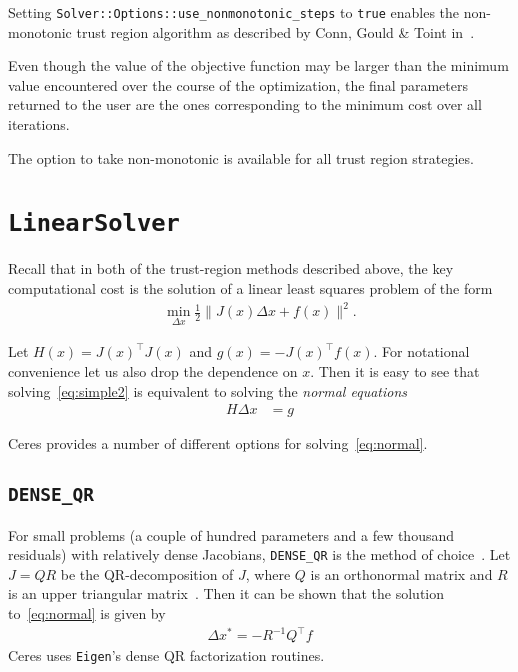 Setting \texttt{Solver::Options::use\_nonmonotonic\_steps} to \texttt{true}
enables the non-monotonic trust region algorithm as described by
Conn,  Gould \& Toint in~\cite{conn2000trust}.

Even though the value of the objective function may be larger
than the minimum value encountered over the course of the
optimization, the final parameters returned to the user are the
ones corresponding to the minimum cost over all iterations.

The option to take non-monotonic is available for all trust region
strategies.

\section{\texttt{LinearSolver}}
Recall that in both of the trust-region methods described above, the key computational cost is the solution of a linear least squares problem of the form
\begin{align}
 \min_{\Delta x} \frac{1}{2} \|J(x)\Delta x + f(x)\|^2 .
 \label{eq:simple2}
\end{align}


Let $H(x)= J(x)^\top J(x)$ and $g(x) = -J(x)^\top  f(x)$. For notational convenience let us also drop the dependence on $x$. Then it is easy to see that solving~\eqref{eq:simple2} is equivalent to solving the {\em normal equations}
\begin{align}
H \Delta x  &= g \label{eq:normal}
\end{align}

Ceres provides a number of different options for solving~\eqref{eq:normal}.

\subsection{\texttt{DENSE\_QR}}
For small problems (a couple of hundred parameters and a few thousand residuals) with relatively dense Jacobians, \texttt{DENSE\_QR} is the method of choice~\cite{bjorck1996numerical}. Let $J = QR$ be the QR-decomposition of $J$, where $Q$ is an orthonormal matrix and $R$ is an upper triangular matrix~\cite{trefethen1997numerical}. Then it can be shown that the solution to~\eqref{eq:normal} is given by
\begin{align}
    \Delta x^* = -R^{-1}Q^\top f
\end{align}
Ceres uses \texttt{Eigen}'s dense QR factorization routines.

